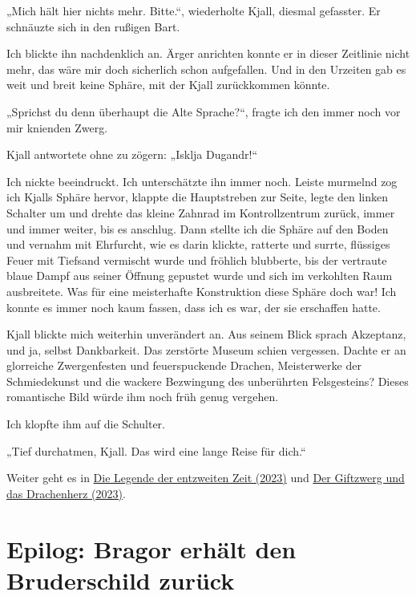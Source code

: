„Mich hält hier nichts mehr. Bitte.“, wiederholte Kjall, diesmal gefasster. Er schnäuzte sich in den rußigen Bart.

Ich blickte ihn nachdenklich an. Ärger anrichten konnte er in dieser Zeitlinie nicht mehr, das wäre mir doch sicherlich schon aufgefallen. Und in den Urzeiten gab es weit und breit keine Sphäre, mit der Kjall zurückkommen könnte.

„Sprichst du denn überhaupt die Alte Sprache?“, fragte ich den immer noch vor mir knienden Zwerg.

Kjall antwortete ohne zu zögern: „Isklja Dugandr!“

Ich nickte beeindruckt. Ich unterschätzte ihn immer noch. Leiste murmelnd zog ich Kjalls Sphäre hervor, klappte die Hauptstreben zur Seite, legte den linken Schalter um und drehte das kleine Zahnrad im Kontrollzentrum zurück, immer und immer weiter, bis es anschlug. Dann stellte ich die Sphäre auf den Boden und vernahm mit Ehrfurcht, wie es darin klickte, ratterte und surrte, flüssiges Feuer mit Tiefsand vermischt wurde und fröhlich blubberte, bis der vertraute blaue Dampf aus seiner Öffnung gepustet wurde und sich im verkohlten Raum ausbreitete. Was für eine meisterhafte Konstruktion diese Sphäre doch war! Ich konnte es immer noch kaum fassen, dass ich es war, der sie erschaffen hatte.

Kjall blickte mich weiterhin unverändert an. Aus seinem Blick sprach Akzeptanz, und ja, selbst Dankbarkeit. Das zerstörte Museum schien vergessen. Dachte er an glorreiche Zwergenfesten und feuerspuckende Drachen, Meisterwerke der Schmiedekunst und die wackere Bezwingung des unberührten Felsgesteins? Dieses romantische Bild würde ihm noch früh genug vergehen.

Ich klopfte ihm auf die Schulter.

„Tief durchatmen, Kjall. Das wird eine lange Reise für dich.“


\begin{commentbox}
    Weiter geht es in \hyperref[2023-die-legende-der-entzweiten-zeit]{Die Legende der entzweiten Zeit (2023)} und \hyperref[2023-der-giftzwerg-und-das-drachenherz]{Der Giftzwerg und das Drachenherz (2023)}.
\end{commentbox}








\newpage
\section{Epilog: Bragor erhält den Bruderschild zurück}

